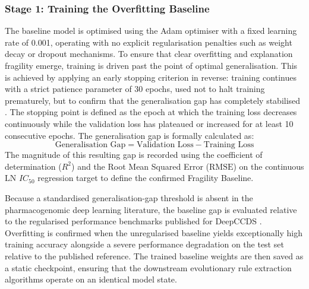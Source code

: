 \subsubsection{Stage 1: Training the Overfitting Baseline}
\label{ssub:method_training}
The baseline model is optimised using the Adam optimiser with a fixed learning rate 
of 0.001, operating with no explicit regularisation penalties such as weight decay 
or dropout mechanisms. To ensure that clear overfitting and explanation fragility 
emerge, training is driven past the point of optimal generalisation. This is 
achieved by applying an early stopping criterion in reverse: training continues with 
a strict patience parameter of 30 epochs, used not to halt training prematurely, but 
to confirm that the generalisation gap has completely stabilised \cite{Goodfellow2016}. 
The stopping point is defined as the epoch at which the training loss decreases 
continuously while the validation loss has plateaued or increased for at least 10 
consecutive epochs. The generalisation gap is formally calculated as:
\begin{equation}
    \text{Generalisation Gap} = \text{Validation Loss} - \text{Training Loss}
\end{equation}
The magnitude of this resulting gap is recorded using the coefficient of determination 
($R^2$) and the Root Mean Squared Error ($\text{RMSE}$) on the continuous 
$\text{LN } IC_{50}$ regression target to define the confirmed Fragility Baseline. 

\noindent
Because a standardised generalisation-gap threshold is absent in the pharmacogenomic 
deep learning literature, the baseline gap is evaluated relative to the regularised performance 
benchmarks published for DeepCCDS \cite{Wu2025}. Overfitting is confirmed when the 
unregularised baseline yields exceptionally high training accuracy alongside a severe 
performance degradation on the test set relative to the published reference. The trained 
baseline weights are then saved as a static checkpoint, ensuring that the downstream 
evolutionary rule extraction algorithms operate on an identical model state.

